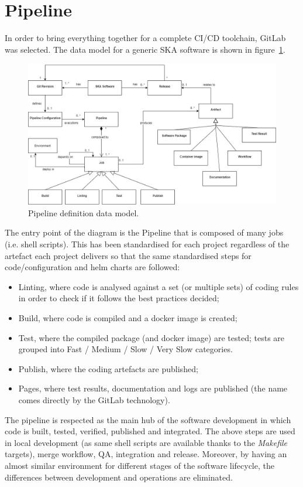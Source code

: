 \documentclass[a4paper]{spie}  %
\begin{document}
\section{Pipeline} \label{pipeline}

In order to bring everything together for a complete CI/CD toolchain, GitLab~\cite{gitlab} was selected. The data model for a generic SKA software is shown in figure~\ref{fig:pipelinedatamodel}.

\begin{figure}[!htb]
   \centering
   \includegraphics*[width=0.8\columnwidth]{dataEntity}
   \caption{Pipeline definition data model.}
   \label{fig:pipelinedatamodel}
\end{figure}

The entry point of the diagram is the Pipeline that is composed of many jobs (i.e. shell scripts).  This has been standardised for each project regardless of the artefact each project delivers so that the same standardised steps for code/configuration and helm charts are followed:
\begin{itemize}
    \item Linting, where code is analysed against a set (or multiple sets) of coding rules in order to check if it follows the best practices decided;
    \item Build, where code is compiled and a docker image is created;
    \item Test, where the compiled package (and docker image) are tested; tests are grouped into Fast / Medium / Slow / Very Slow categories.
    \item Publish, where the coding artefacts are published;
    \item Pages, where test results, documentation and logs are published (the name comes directly by the GitLab technology).
\end{itemize}

The pipeline is respected as the main hub of the software development in which code is built, tested, verified, published and integrated. The above steps are used in local development (as same shell scripts are available thanks to the \textit{Makefile} targets), merge workflow, QA, integration and release. Moreover, by having an almost similar environment for different stages of the software lifecycle, the differences between development and operations are eliminated.
\end{document}

